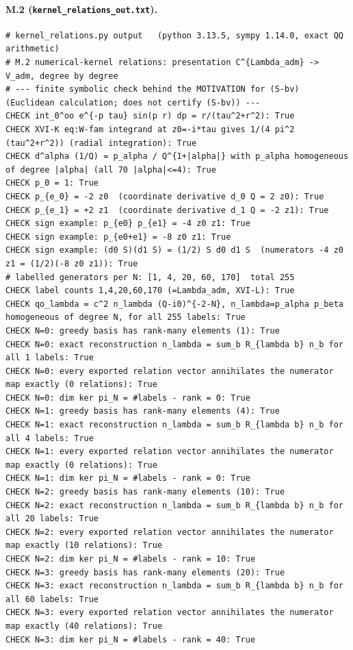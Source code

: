 \documentclass{article}
\theoremstyle{remark}
\begin{document}
\paragraph{M.2 (\texttt{kernel\_relations\_out.txt}).}
\begin{lstlisting}
# kernel_relations.py output   (python 3.13.5, sympy 1.14.0, exact QQ arithmetic)
# M.2 numerical-kernel relations: presentation C^{Lambda_adm} -> V_adm, degree by degree
# --- finite symbolic check behind the MOTIVATION for (S-bv) (Euclidean calculation; does not certify (S-bv)) ---
CHECK int_0^oo e^{-p tau} sin(p r) dp = r/(tau^2+r^2): True
CHECK XVI-K eq:W-fam integrand at z0=-i*tau gives 1/(4 pi^2 (tau^2+r^2)) (radial integration): True
CHECK d^alpha (1/Q) = p_alpha / Q^{1+|alpha|} with p_alpha homogeneous of degree |alpha| (all 70 |alpha|<=4): True
CHECK p_0 = 1: True
CHECK p_{e_0} = -2 z0  (coordinate derivative d_0 Q = 2 z0): True
CHECK p_{e_1} = +2 z1  (coordinate derivative d_1 Q = -2 z1): True
CHECK sign example: p_{e0} p_{e1} = -4 z0 z1: True
CHECK sign example: p_{e0+e1} = -8 z0 z1: True
CHECK sign example: (d0 S)(d1 S) = (1/2) S d0 d1 S  (numerators -4 z0 z1 = (1/2)(-8 z0 z1)): True
# labelled generators per N: [1, 4, 20, 60, 170]  total 255
CHECK label counts 1,4,20,60,170 (=Lambda_adm, XVI-L): True
CHECK qo_lambda = c^2 n_lambda (Q-i0)^{-2-N}, n_lambda=p_alpha p_beta homogeneous of degree N, for all 255 labels: True
CHECK N=0: greedy basis has rank-many elements (1): True
CHECK N=0: exact reconstruction n_lambda = sum_b R_{lambda b} n_b for all 1 labels: True
CHECK N=0: every exported relation vector annihilates the numerator map exactly (0 relations): True
CHECK N=0: dim ker pi_N = #labels - rank = 0: True
CHECK N=1: greedy basis has rank-many elements (4): True
CHECK N=1: exact reconstruction n_lambda = sum_b R_{lambda b} n_b for all 4 labels: True
CHECK N=1: every exported relation vector annihilates the numerator map exactly (0 relations): True
CHECK N=1: dim ker pi_N = #labels - rank = 0: True
CHECK N=2: greedy basis has rank-many elements (10): True
CHECK N=2: exact reconstruction n_lambda = sum_b R_{lambda b} n_b for all 20 labels: True
CHECK N=2: every exported relation vector annihilates the numerator map exactly (10 relations): True
CHECK N=2: dim ker pi_N = #labels - rank = 10: True
CHECK N=3: greedy basis has rank-many elements (20): True
CHECK N=3: exact reconstruction n_lambda = sum_b R_{lambda b} n_b for all 60 labels: True
CHECK N=3: every exported relation vector annihilates the numerator map exactly (40 relations): True
CHECK N=3: dim ker pi_N = #labels - rank = 40: True

\end{lstlisting}
\end{document}
